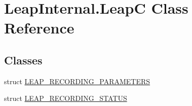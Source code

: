 \hypertarget{class_leap_internal_1_1_leap_c}{}\section{Leap\+Internal.\+LeapC Class Reference}
\label{class_leap_internal_1_1_leap_c}
\subsection*{Classes}
\begin{DoxyCompactItemize}
\item 
struct \mbox{\hyperlink{struct_leap_internal_1_1_leap_c_1_1_l_e_a_p___r_e_c_o_r_d_i_n_g___p_a_r_a_m_e_t_e_r_s}{L\+E\+A\+P\+\_\+\+R\+E\+C\+O\+R\+D\+I\+N\+G\+\_\+\+P\+A\+R\+A\+M\+E\+T\+E\+RS}}
\item 
struct \mbox{\hyperlink{struct_leap_internal_1_1_leap_c_1_1_l_e_a_p___r_e_c_o_r_d_i_n_g___s_t_a_t_u_s}{L\+E\+A\+P\+\_\+\+R\+E\+C\+O\+R\+D\+I\+N\+G\+\_\+\+S\+T\+A\+T\+US}}
\end{DoxyCompactItemize}
